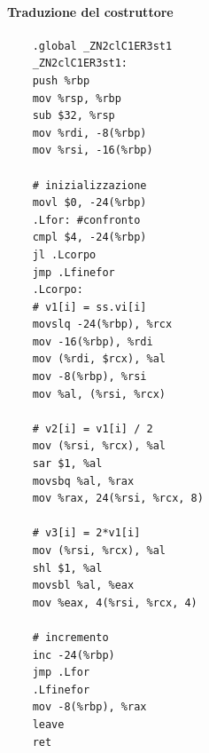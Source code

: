 \paragraph{Traduzione del costruttore}
\begin{verbatim}
	.global _ZN2clC1ER3st1
	_ZN2clC1ER3st1:
	push %rbp
	mov %rsp, %rbp
	sub $32, %rsp
	mov %rdi, -8(%rbp)
	mov %rsi, -16(%rbp)
	
	# inizializzazione
	movl $0, -24(%rbp)
	.Lfor: #confronto
	cmpl $4, -24(%rbp)
	jl .Lcorpo
	jmp .Lfinefor
	.Lcorpo:
	# v1[i] = ss.vi[i]
	movslq -24(%rbp), %rcx
	mov -16(%rbp), %rdi
	mov (%rdi, $rcx), %al
	mov -8(%rbp), %rsi
	mov %al, (%rsi, %rcx)
	
	# v2[i] = v1[i] / 2
	mov (%rsi, %rcx), %al
	sar $1, %al
	movsbq %al, %rax
	mov %rax, 24(%rsi, %rcx, 8)
	
	# v3[i] = 2*v1[i]
	mov (%rsi, %rcx), %al
	shl $1, %al
	movsbl %al, %eax
	mov %eax, 4(%rsi, %rcx, 4)
	
	# incremento     
	inc -24(%rbp)
	jmp .Lfor
	.Lfinefor 
	mov -8(%rbp), %rax
	leave
	ret
\end{verbatim}
